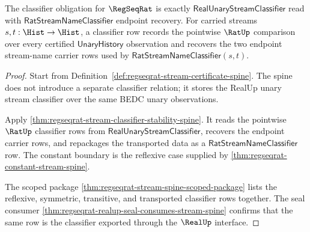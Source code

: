 \begin{theorem}
\label{thm:regseqrat-classifier-obligation}
The classifier obligation for $\RegSeqRat$ is exactly
$\mathsf{RealUnaryStreamClassifier}$ read with
$\mathsf{RatStreamNameClassifier}$ endpoint recovery. For carried streams
$s,t:\Hist\to\Hist$, a classifier row records the pointwise $\RatUp$
comparison over every certified $\mathsf{UnaryHistory}$ observation and
recovers the two endpoint stream-name carrier rows used by
$\mathsf{RatStreamNameClassifier}(s,t)$.
\end{theorem}
\begin{proof}
Start from Definition~\ref{def:regseqrat-stream-certificate-spine}. The spine
does not introduce a separate classifier relation; it stores the RealUp unary
stream classifier over the same BEDC unary observations.

Apply \autoref{thm:regseqrat-stream-classifier-stability-spine}. It reads the
pointwise $\RatUp$ classifier rows from
$\mathsf{RealUnaryStreamClassifier}$, recovers the endpoint carrier rows, and
repackages the transported data as a
$\mathsf{RatStreamNameClassifier}$ row. The constant boundary is the reflexive
case supplied by \autoref{thm:regseqrat-constant-stream-spine}.

The scoped package
\autoref{thm:regseqrat-stream-spine-scoped-package} lists the reflexive,
symmetric, transitive, and transported classifier rows together. The seal
consumer \autoref{thm:regseqrat-realup-seal-consumes-stream-spine} confirms
that the same row is the classifier exported through the $\RealUp$ interface.
\end{proof}

